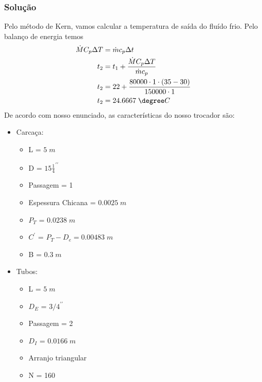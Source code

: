 \subsubsection{Solução}
Pelo método de Kern, vamos calcular a temperatura de saída do fluído frio. Pelo balanço de energia
temos
\begin{align}
    \dot{M}C_{p} \Delta T &= \dot{m}  c_p \Delta t \\
    t_2 &= t_1 + \frac{\dot{M} C_p \Delta T}{\dot{m}c_{p}}\\
    t_2 &= 22 + \frac{80000 \cdot 1 \cdot \left( 35 - 30 \right) }{150000 \cdot 1}\\
    t_2 &= 24.6667 \; \degree C
\end{align}
De acordo com nosso enunciado, as características do nosso trocador são:
\begin{itemize}
    \item {Carcaça:\\
            \begin{itemize}
            \item L = \(5 \; m\)  \\
            \item D = \(15 \frac{1}{4}^{\prime \prime} \)\\
            \item Passagem = 1\\
            \item Espessura Chicana = \(0.0025 \; m\) \\
            \item \(P_{T} \) = \(0.0238 \; m\) \\
            \item \(C^{\prime} \) = \(P_{T} - D_{e} = 0.00483 \; m\)\\
            \item B = \(0.3 \; m\) \\
            \end{itemize}
    }
    \item {Tubos:\\
            \begin{itemize}
            \item L = \(5 \; m\) \\
            \item \(D_{E}\)  = \(3/4^{\prime \prime} \)\\
            \item Passagem = 2\\
            \item \(D_{I}\) = \(0.0166 \; m\)\\
            \item Arranjo triangular\\
            \item N = 160\\  
            \end{itemize}
    }
\end{itemize}

